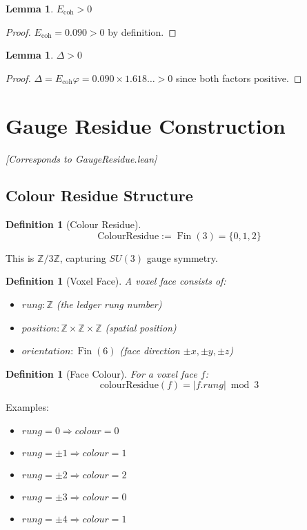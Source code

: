 \documentclass[11pt]{article}
\numberwithin{equation}{section}
\newtheorem{lemma}[theorem]{Lemma}
\newtheorem{definition}[theorem]{Definition}
\theoremstyle{remark}
\newcommand{\Ecoh}{E_{\text{coh}}}
\newcommand{\massGap}{\Delta}
\newcommand{\Z}{\mathbb{Z}}
\DeclareMathOperator{\Fin}{Fin}
\begin{document}
\begin{lemma}
$\Ecoh > 0$
\end{lemma}
\begin{proof}
$\Ecoh = 0.090 > 0$ by definition.
\end{proof}

\begin{lemma}
$\massGap > 0$
\end{lemma}
\begin{proof}
$\massGap = \Ecoh \varphi = 0.090 \times 1.618\ldots > 0$ since both factors positive.
\end{proof}

\section{Gauge Residue Construction}
\textit{[Corresponds to GaugeResidue.lean]}

\subsection{Colour Residue Structure}

\begin{definition}[Colour Residue]
\[\text{ColourResidue} := \Fin(3) = \{0, 1, 2\}\]
\end{definition}

This is $\Z/3\Z$, capturing $SU(3)$ gauge symmetry.

\begin{definition}[Voxel Face]
A voxel face consists of:
\begin{itemize}
\item $rung : \Z$ (the ledger rung number)
\item $position : \Z \times \Z \times \Z$ (spatial position)
\item $orientation : \Fin(6)$ (face direction $\pm x, \pm y, \pm z$)
\end{itemize}
\end{definition}

\begin{definition}[Face Colour]
For a voxel face $f$:
\[\text{colourResidue}(f) = |f.rung| \bmod 3\]
\end{definition}

Examples:
\begin{itemize}
\item $rung = 0 \Rightarrow colour = 0$
\item $rung = \pm 1 \Rightarrow colour = 1$
\item $rung = \pm 2 \Rightarrow colour = 2$
\item $rung = \pm 3 \Rightarrow colour = 0$
\item $rung = \pm 4 \Rightarrow colour = 1$
\end{itemize}
\end{document}
